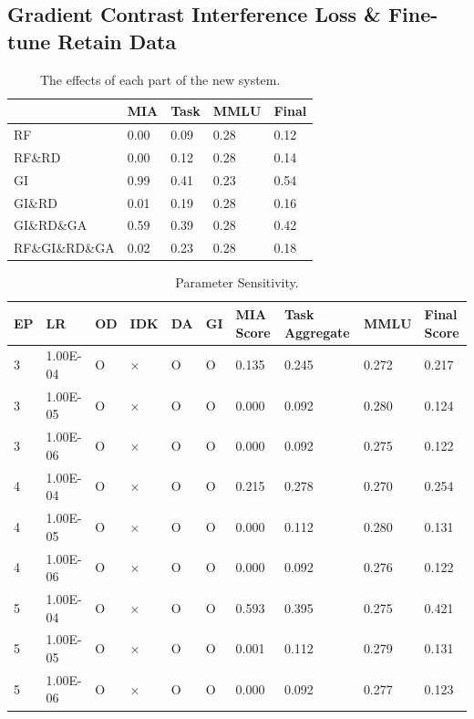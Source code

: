 \documentclass[11pt]{article}
\begin{document}
\subsection{Gradient Contrast Interference Loss \& Fine-tune Retain Data} 

\begin{table}[h]\footnotesize
  \centering
    \begin{tabular}{l|l|l|l|l}
    \hline
        ~ & MIA & Task & MMLU & Final \\ \hline
        RF & 0.00 & 0.09 & 0.28 & 0.12 \\ \hline
        RF\&RD & 0.00 & 0.12 & 0.28 & 0.14 \\ \hline
        GI & 0.99 & 0.41 & 0.23 & 0.54 \\ \hline
        GI\&RD & 0.01 & 0.19 & 0.28 & 0.16 \\ \hline
        GI\&RD\&GA & 0.59 & 0.39 & 0.28 & 0.42 \\ \hline
        RF\&GI\&RD\&GA & 0.02 & 0.23 & 0.28 & 0.18 \\ \hline
    \end{tabular}
  \caption{The effects of each part of the new system.}
  \label{tab:accents}
\end{table}

\begin{table}[t]
  \centering
    \begin{tabular}{|l|l|l|l|l|l|l|l|l|l|}
    \hline
        EP & LR & OD & IDK & DA & GI & MIA Score & Task Aggregate & MMLU & Final Score \\ \hline
        3 & 1.00E-04 & O & × & O & O & 0.135 & 0.245 & 0.272 & 0.217 \\ \hline
        3 & 1.00E-05 & O & × & O & O & 0.000 & 0.092 & 0.280 & 0.124 \\ \hline
        3 & 1.00E-06 & O & × & O & O & 0.000 & 0.092 & 0.275 & 0.122 \\ \hline
        4 & 1.00E-04 & O & × & O & O & 0.215 & 0.278 & 0.270 & 0.254 \\ \hline
        4 & 1.00E-05 & O & × & O & O & 0.000 & 0.112 & 0.280 & 0.131 \\ \hline
        4 & 1.00E-06 & O & × & O & O & 0.000 & 0.092 & 0.276 & 0.122 \\ \hline
        5 & 1.00E-04 & O & × & O & O & 0.593 & 0.395 & 0.275 & 0.421 \\ \hline
        5 & 1.00E-05 & O & × & O & O & 0.001 & 0.112 & 0.279 & 0.131 \\ \hline
        5 & 1.00E-06 & O & × & O & O & 0.000 & 0.092 & 0.277 & 0.123 \\ \hline
    \end{tabular}
  \caption{
    Parameter Sensitivity.  }
\label{tab:AS1}
\end{table}
\end{document}

